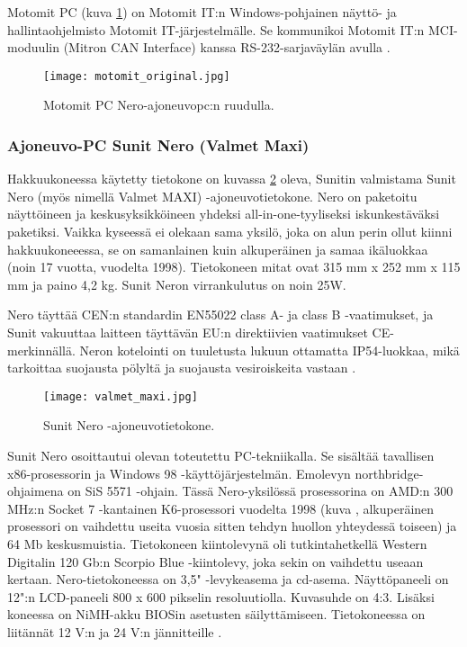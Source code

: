 Motomit PC (kuva \ref{motomit:kuvankaappaus}) on Motomit IT:n Windows-pohjainen näyttö- ja hallintaohjelmisto Motomit IT-järjestelmälle. Se kommunikoi Motomit IT:n MCI-moduulin (Mitron CAN Interface) kanssa RS-232-sarjaväylän avulla \cite{motomit:esite}.
\newline
\begin{figure}[H]
\centering
\texttt{[image: motomit\_original.jpg]}
\caption{Motomit PC Nero-ajoneuvopc:n ruudulla.}
\label{motomit:kuvankaappaus}
\end{figure}

\subsubsection{Ajoneuvo-PC Sunit Nero (Valmet Maxi)}
Hakkuukoneessa käytetty tietokone on kuvassa \ref{kuva_nero} oleva, Sunitin valmistama Sunit Nero (myös nimellä Valmet MAXI) -ajoneuvotietokone. Nero on paketoitu näyttöineen ja keskusyksikköineen yhdeksi all-in-one-tyyliseksi iskunkestäväksi paketiksi. Vaikka kyseessä ei olekaan sama yksilö, joka on alun perin ollut kiinni hakkuukoneeessa, se on samanlainen kuin alkuperäinen ja samaa ikäluokkaa (noin 17 vuotta, vuodelta 1998). Tietokoneen mitat ovat 315 mm x 252 mm x 115 mm ja paino 4,2 kg. Sunit Neron virrankulutus on noin 25W.

Nero täyttää CEN:n standardin EN55022 class A- ja class B -vaatimukset, ja Sunit vakuuttaa laitteen täyttävän EU:n direktiivien vaatimukset CE-merkinnällä. Neron kotelointi on tuuletusta lukuun ottamatta IP54-luokkaa, mikä tarkoittaa suojausta pölyltä ja suojausta vesiroiskeita vastaan \cite{nero:manual}.

\begin{figure}[H]
\centering
\texttt{[image: valmet\_maxi.jpg]}
\caption{Sunit Nero -ajoneuvotietokone.}
\label{kuva_nero}
\end{figure}

Sunit Nero osoittautui olevan toteutettu PC-tekniikalla. Se sisältää tavallisen x86-prosessorin ja Windows 98 -käyttöjärjestelmän. Emolevyn northbridge-ohjaimena on SiS 5571 -ohjain. Tässä Nero-yksilössä prosessorina on AMD:n 300 MHz:n Socket 7 -kantainen K6-prosessori vuodelta 1998 (kuva \label{kuva_prossu}, alkuperäinen prosessori on vaihdettu useita vuosia sitten tehdyn huollon yhteydessä toiseen) ja 64 Mb keskusmuistia. Tietokoneen kiintolevynä oli tutkintahetkellä Western Digitalin 120 Gb:n Scorpio Blue -kiintolevy, joka sekin on vaihdettu useaan kertaan. Nero-tietokoneessa on 3,5" -levykeasema ja cd-asema. Näyttöpaneeli on 12":n LCD-paneeli 800 x 600 pikselin resoluutiolla. Kuvasuhde on 4:3. Lisäksi koneessa on NiMH-akku BIOSin asetusten säilyttämiseen. Tietokoneessa on liitännät 12 V:n ja 24 V:n jännitteille \cite{nero:manual}.
\newline\newline

